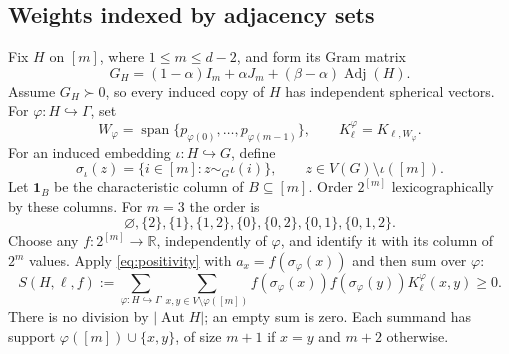 \documentclass[11pt]{article}
\theoremstyle{remark}
\newcommand{\R}{\mathbb R}
\DeclareMathOperator{\Adj}{Adj}
\DeclareMathOperator{\Aut}{Aut}
\numberwithin{equation}{section}
\begin{document}
\subsection{Weights indexed by adjacency sets}\label{subsec:weights}
Fix $H$ on $[m]$, where $1\le m\le d-2$, and form its Gram matrix
\begin{equation}\label{eq:GH}
 G_H=(1-\alpha)I_m+\alpha J_m+(\beta-\alpha)\Adj(H).
\end{equation}
Assume $G_H\succ0$, so every induced copy of $H$ has independent
spherical vectors.
For $\varphi:H\hookrightarrow\Gamma$, set
\[
 W_\varphi=\operatorname{span}\{p_{\varphi(0)},\ldots,p_{\varphi(m-1)}\},
 \qquad K_\ell^\varphi=K_{\ell,W_\varphi}.
\]
For an induced embedding $\iota:H\hookrightarrow G$, define
\begin{equation}\label{eq:sigma}
 \sigma_\iota(z)=\{i\in[m]:z\sim_G\iota(i)\},
 \qquad z\in V(G)\setminus\iota([m]).
\end{equation}
Let $\mathbf1_B$ be the characteristic column of $B\subseteq[m]$.
Order $2^{[m]}$ lexicographically by these columns. For $m=3$ the order is
\begin{equation}\label{eq:profileorder}
 \varnothing,\{2\},\{1\},\{1,2\},\{0\},\{0,2\},\{0,1\},\{0,1,2\}.
\end{equation}
Choose any $f:2^{[m]}\to\R$, independently of $\varphi$, and identify
it with its column of $2^m$ values. Apply \eqref{eq:positivity} with
$a_x=f(\sigma_\varphi(x))$ and then sum over $\varphi$:
\begin{equation}\label{eq:S}
 S(H,\ell,f):=\sum_{\varphi:H\hookrightarrow\Gamma}
 \sum_{x,y\in V\setminus\varphi([m])}
 f(\sigma_\varphi(x))f(\sigma_\varphi(y))K_\ell^\varphi(x,y)\ge0.
\end{equation}
There is no division by $|\Aut H|$; an empty sum is zero.
Each summand has support $\varphi([m])\cup\{x,y\}$, of size $m+1$
if $x=y$ and $m+2$ otherwise.
\end{document}
